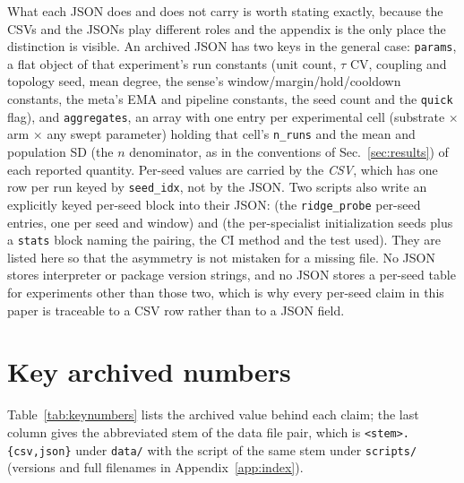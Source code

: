 \documentclass[preprint,12pt]{elsarticle}
\newcommand{\fpath}[1]{{\small\ttfamily\path{#1}}}
\begin{document}
What each JSON does and does not carry is worth stating exactly, because the
CSVs and the JSONs play different roles and the appendix is the only place the
distinction is visible. An archived JSON has two keys in the general case:
\texttt{params}, a flat object of that experiment's run constants (unit count,
$\tau$ CV, coupling and topology seed, mean degree, the sense's
window/margin/hold/cooldown constants, the meta's EMA and pipeline constants,
the seed count and the \texttt{quick} flag), and \texttt{aggregates}, an array
with one entry per experimental cell (substrate $\times$ arm $\times$ any swept
parameter) holding that cell's \texttt{n\_runs} and the mean and population SD
(the $n$ denominator, as in the conventions of Sec.~\ref{sec:results}) of each reported quantity. Per-seed values are carried by the \emph{CSV}, which
has one row per run keyed by \texttt{seed\_idx}, not by the JSON. Two
scripts also write an explicitly keyed per-seed block into their JSON:
\fpath{s48} (the \texttt{ridge\_probe} per-seed entries, one per seed and
window) and \fpath{s52} (the per-specialist initialization seeds plus a
\texttt{stats} block naming the pairing, the CI method and the test used).
They are listed here so that the asymmetry is not mistaken for a missing file.
No JSON stores interpreter or package version strings, and no JSON stores a
per-seed table for experiments other than those two, which is why every
per-seed claim in this paper is traceable to a CSV row rather than to a JSON
field.

\section{Key archived numbers}
\label{app:numbers}

Table~\ref{tab:keynumbers} lists the archived value behind each claim; the
last column gives
the abbreviated stem of the data file pair, which is
\texttt{<stem>.\{csv,json\}} under \texttt{data/} with the script of the same
stem under \texttt{scripts/} (versions and full filenames in
Appendix~\ref{app:index}).
\end{document}
